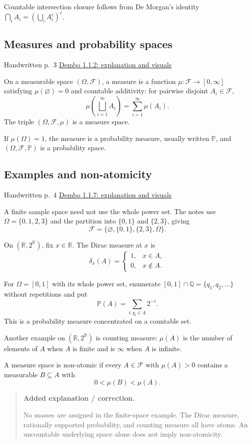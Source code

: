 \documentclass[11pt,letterpaper]{article}
\newcommand{\lecturesection}[1]{\subsection{#1}}
\begin{document}
Countable intersection closure follows from De Morgan's identity $\bigcap_iA_i=(\bigcup_iA_i^c)^c$.

\hypertarget{l1-s3}{}
\lecturesection{Measures and probability spaces}
{\small\textcolor{lectureink}{Handwritten p.\ 3} \quad \href{https://josephrbailey.com/probability/\#entry-1-1-2}{Dembo 1.1.2: explanation and visuals}}

On a measurable space $(\Omega,\mathcal F)$, a measure is a function $\mu:\mathcal F\to[0,\infty]$ satisfying $\mu(\varnothing)=0$ and countable additivity: for pairwise disjoint $A_i\in\mathcal F$, \[\mu\!\left(\bigsqcup_{i=1}^{\infty}A_i\right)=\sum_{i=1}^{\infty}\mu(A_i).\] The triple $(\Omega,\mathcal F,\mu)$ is a measure space.

If $\mu(\Omega)=1$, the measure is a probability measure, usually written $\mathbb P$, and $(\Omega,\mathcal F,\mathbb P)$ is a probability space.

\hypertarget{l1-s4}{}
\lecturesection{Examples and non-atomicity}
{\small\textcolor{lectureink}{Handwritten p.\ 4} \quad \href{https://josephrbailey.com/probability/\#entry-1-1-7}{Dembo 1.1.7: explanation and visuals}}

A finite sample space need not use the whole power set. The notes use $\Omega=\{0,1,2,3\}$ and the partition into $\{0,1\}$ and $\{2,3\}$, giving \[\mathcal F=\{\varnothing,\{0,1\},\{2,3\},\Omega\}.\]

On $(\mathbb R,2^{\mathbb R})$, fix $x\in\mathbb R$. The Dirac measure at $x$ is \[\delta_x(A)=\begin{cases}1,&x\in A,\\0,&x\notin A.\end{cases}\]

For $\Omega=[0,1]$ with its whole power set, enumerate $[0,1]\cap\mathbb Q=\{q_1,q_2,\ldots\}$ without repetitions and put \[\mathbb P(A)=\sum_{i:q_i\in A}2^{-i}.\] This is a probability measure concentrated on a countable set.

Another example on $(\mathbb R,2^{\mathbb R})$ is counting measure: $\mu(A)$ is the number of elements of $A$ when $A$ is finite and is $\infty$ when $A$ is infinite.

A measure space is non-atomic if every $A\in\mathcal F$ with $\mu(A)>0$ contains a measurable $B\subseteq A$ with \[0<\mu(B)<\mu(A).\]

\begin{quote}\small\textbf{Added explanation / correction.}

No masses are assigned in the finite-space example. The Dirac measure, rationally supported probability, and counting measure all have atoms. An uncountable underlying space alone does not imply non-atomicity.
\end{quote}
\end{document}
